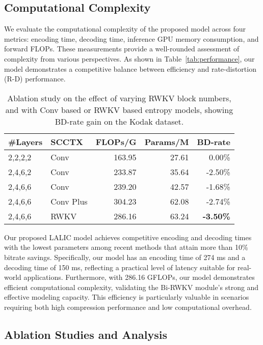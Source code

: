 \subsection{Computational Complexity}

We evaluate the computational complexity of the proposed model across four metrics: encoding time, decoding time, inference GPU memory consumption, and forward FLOPs. These measurements provide a well-rounded assessment of complexity from various perspectives. As shown in Table~\ref{tab:performance}, our model demonstrates a competitive balance between efficiency and rate-distortion (R-D) performance.

\begin{table}[tb]
\centering
\begin{tabular}{@{}llrrr@{}}
\toprule
\#Layers  & SCCTX     & FLOPs/G & Params/M & BD-rate \\ \midrule
2,2,2,2   & Conv      & 163.95    & 27.61      & 0.00\%     \\
2,4,6,2   & Conv      & 233.87    & 35.64      & -2.50\%    \\
2,4,6,6   & Conv      & 239.20    & 42.57      & -1.68\%    \\
2,4,6,6   & Conv Plus & 304.23    & 62.08      & -2.74\%    \\
2,4,6,6   & RWKV      & 286.16    & 63.24      & \textbf{-3.50\%}    \\ \bottomrule
\end{tabular}
\caption{Ablation study on the effect of varying RWKV block numbers, and with Conv based or RWKV based entropy models, showing BD-rate gain on the Kodak dataset.}
\label{tab:ablation}
\end{table}

Our proposed LALIC model achieves competitive encoding and decoding times with the lowest parameters among recent methods that attain more than 10\% bitrate savings. Specifically, our model has an encoding time of 274 ms and a decoding time of 150 ms, reflecting a practical level of latency suitable for real-world applications. Furthermore, with 286.16 GFLOPs, our model demonstrates efficient computational complexity, validating the Bi-RWKV module’s strong and effective modeling capacity. This efficiency is particularly valuable in scenarios requiring both high compression performance and low computational overhead.


\subsection{Ablation Studies and Analysis}

